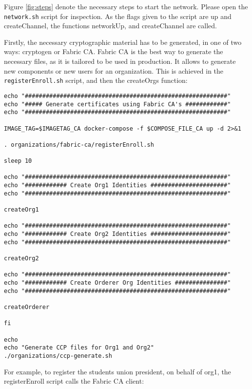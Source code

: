 \documentclass[12pt,a4paper]{article}
\theoremstyle{definition}
\begin{document}
Figure \ref{fig:steps} denote the necessary steps to start the network. Please open the \texttt{network.sh} script for inspection. As the flags given to the script are up and createChannel, the functions networkUp, and createChannel are called.

Firstly, the necessary cryptographic material has to be generated, in one of two ways: cryptogen or Fabric CA. Fabric CA is the best way to generate the necessary files, as it is tailored to be used in production. It allows to generate new components or new users for an organization. This is achieved in the \texttt{registerEnroll.sh} script, and then the createOrgs function:

\begin{verbatim}
echo "##########################################################"
echo "##### Generate certificates using Fabric CA's ############"
echo "##########################################################"

IMAGE_TAG=$IMAGETAG_CA docker-compose -f $COMPOSE_FILE_CA up -d 2>&1

. organizations/fabric-ca/registerEnroll.sh

sleep 10

echo "##########################################################"
echo "############ Create Org1 Identities ######################"
echo "##########################################################"

createOrg1

echo "##########################################################"
echo "############ Create Org2 Identities ######################"
echo "##########################################################"

createOrg2

echo "##########################################################"
echo "############ Create Orderer Org Identities ###############"
echo "##########################################################"

createOrderer

fi

echo
echo "Generate CCP files for Org1 and Org2"
./organizations/ccp-generate.sh
\end{verbatim}

For example, to register the students union president, on behalf of org1, the registerEnroll script calls the Fabric CA client:
\end{document}

